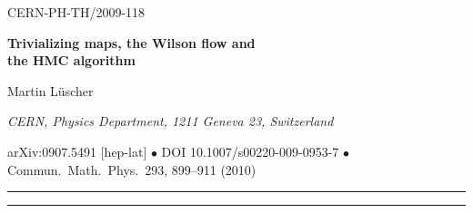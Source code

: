 \documentclass[11pt]{article}
\numberwithin{equation}{section}
\begin{document}
\hfill CERN-PH-TH/2009-118

\vspace{1.5cm}
\begin{center}
  {\Large\bfseries Trivializing maps, the Wilson flow and\\[0.3cm]
  the HMC algorithm\par}
  \vspace{0.6cm}
 {\large Martin L\"uscher\par}
  \vspace{0.8em}
  {\itshape CERN, Physics Department, 1211 Geneva 23, Switzerland\par}
\end{center}

\vspace{0.4cm}
\begin{flushleft}\small
arXiv:0907.5491 [hep-lat] \quad$\bullet$\quad
DOI 10.1007/s00220-009-0953-7 \quad$\bullet$\quad
Commun.\ Math.\ Phys.\ 293, 899--911 (2010)
\end{flushleft}

\vspace{0.6cm}
\noindent\rule{\textwidth}{0.4pt}
\begin{abstract}
\noindent
In lattice gauge theory, there exist field transformations
that map the theory to the trivial one, where the
basic field variables
are completely decoupled from one another.
Such maps can be constructed systematically
by integrating certain flow equations
in field space.
The construction is worked out
in some detail and it is proposed to
combine the Wilson flow
(which generates approximately trivializing maps
for the Wilson gauge action)
with the HMC simulation algorithm
in order to improve the efficiency of
lattice QCD simulations.
\end{abstract}
\noindent\rule{\textwidth}{0.4pt}









\end{document}
